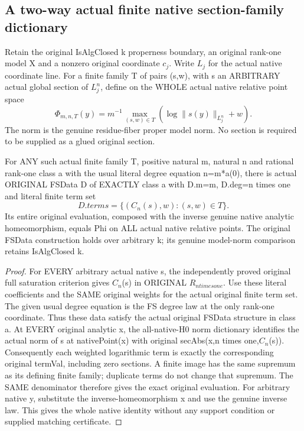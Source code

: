\subsection{A two-way actual finite native section-family dictionary}
Retain the original IsAlgClosed k properness boundary, an original
rank-one model X and a nonzero original coordinate $c_j$. Write $L_j$ for
the actual native coordinate line. For a finite family T of pairs
(s,w), with s an ARBITRARY actual global section of $L_j^n$, define
on the WHOLE actual native relative point space
\[
 \Phi_{m,n,T}(y)=m^{-1}\max_{(s,w)\in T}
       (\log\|s(y)\|_{L_j^n}+w).
\]
The norm is the genuine residue-fiber proper model norm. No section is
required to be supplied as a glued original section.

\begin{theorem}
\label{thm:seven-native-finite-family-to-original-fs}
\leanok
For ANY such actual finite family T, positive natural m, natural n and
rational rank-one class a with the usual literal degree equation
n=m*a(0), there is actual ORIGINAL FSData D of EXACTLY class a with
D.m=m, D.deg=n times one and literal finite term set
\[
 D.terms=\{(C_n(s),w):(s,w)\in T\}.
\]
Its entire original evaluation, composed with the inverse genuine native
analytic homeomorphism, equals Phi on ALL actual native relative points.
The original FSData construction holds over arbitrary k; its genuine
model-norm comparison retains IsAlgClosed k.
\end{theorem}
\begin{proof}
For EVERY arbitrary actual native s, the independently proved original
full saturation criterion gives $C_n$(s) in ORIGINAL $R_{n times one}$.
Use these literal coefficients and the SAME original weights for the
actual original finite term set. The given usual degree equation is the
FS degree law at the only rank-one coordinate. Thus these data satisfy
the actual original FSData structure in class a. At EVERY original
analytic x, the all-native-H0 norm dictionary identifies the actual norm
of s at nativePoint(x) with original secAbs(x,n times one,$C_n$(s)).
Consequently each weighted logarithmic term is exactly the corresponding
original termVal, including zero sections. A finite image has the same
supremum as its defining finite family; duplicate terms do not change
that supremum. The SAME denominator therefore gives the exact original
evaluation. For arbitrary native y, substitute the inverse-homeomorphism
x and use the genuine inverse law. This gives the whole native identity
without any support condition or supplied matching certificate.
\end{proof}

